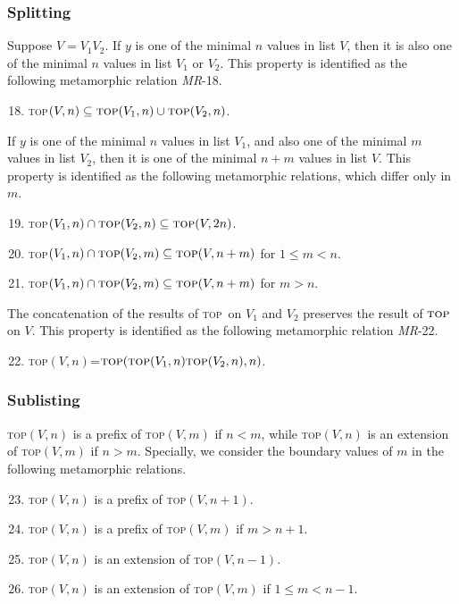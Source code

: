 \documentclass[conference]{IEEEtran}
\theoremstyle{remark}
\newcommand{\Fn}{\textsc{top}}
\newcommand{\MR}{\textit{MR}}
\begin{document}
\subsubsection{Splitting}
Suppose $V=V_1V_2$. If $y$ is one of the minimal $n$ values in list $V$, then it is also one of the minimal $n$ values in list $V_1$ or $V_2$. This property is identified as the following metamorphic relation \MR-18.
\begin{enumerate}[\MR-1]
\setcounter{enumi}{17}
\item \Fn$(V,n)\subseteq\Fn(V_1,n)\cup\Fn(V_2,n)$.
\end{enumerate}

If $y$ is one of the minimal $n$ values in list $V_1$, and also one of the minimal $m$ values in list $V_2$, then it is one of the minimal $n+m$ values in list $V$. This property is identified as the following metamorphic relations, which differ only in $m$.
\begin{enumerate}[\MR-1]
\setcounter{enumi}{18}
\item \Fn$(V_1, n)\cap \Fn(V_2, n)\subseteq \Fn(V, 2n)$.
\item \Fn$(V_1, n)\cap \Fn(V_2, m)\subseteq \Fn(V, n+m)$ for $1\leq m<n$.
\item \Fn$(V_1, n)\cap \Fn(V_2, m)\subseteq \Fn(V, n+m)$ for $m>n$.
\end{enumerate}

The concatenation of the results of \Fn~on $V_1$ and $V_2$ preserves the result of $\Fn$ on $V$. This property is identified as the following metamorphic relation \MR-22.
\begin{enumerate}[\MR-1]
\setcounter{enumi}{21}
\item \Fn$(V,n)$=$\Fn(\Fn(V_1,n)\Fn(V_2,n),n)$.
\end{enumerate}

\subsubsection{Sublisting}
\Fn$(V,n)$ is a prefix of \Fn$(V,m)$ if $n<m$, while \Fn$(V,n)$ is an extension of \Fn$(V,m)$ if $n>m$. Specially, we consider the boundary values of $m$ in the following metamorphic relations.
\begin{enumerate}[\MR-1]
\setcounter{enumi}{22}
\item \Fn$(V,n)$ is a prefix of \Fn$(V,n+1)$.
\item \Fn$(V,n)$ is a prefix of \Fn$(V,m)$ if $m>n+1$.
\item \Fn$(V,n)$ is an extension of \Fn$(V,n-1)$.  
\item \Fn$(V,n)$ is an extension of \Fn$(V,m)$ if $1\leq m<n-1$.  
\end{enumerate}
\end{document}
